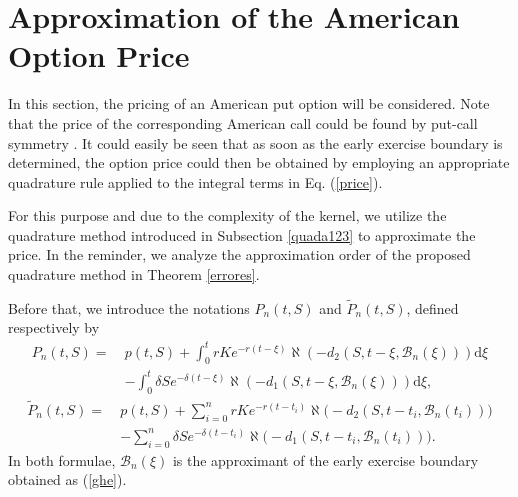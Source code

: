 \documentclass[fleqn,final,3p,11pt]{elsarticle}
\theoremstyle{definition}
\theoremstyle{remark}
\numberwithin{equation}{section}
\begin{document}
\section{Approximation of the American Option Price}\label{thistable}
In this section, the pricing of an American put option will be considered. Note that the price of the corresponding American call could be found by put-call symmetry \cite{andersen}. It could easily be seen that as soon as the early exercise boundary is determined, the option price could then be obtained by employing an appropriate quadrature rule applied to the integral terms in Eq. (\ref{price}).

 For this purpose and due to the complexity of the kernel, we utilize the quadrature method introduced in Subsection \ref{quada123} to approximate the price. In the reminder, we analyze the approximation order of the proposed  quadrature method in Theorem \ref{errores}.

Before that, we introduce the notations $P_{n}(t, S)$ and $\tilde{P}_{n}(t, S)$, defined respectively by
\begin{equation}\label{PN}
\begin{split}
P_{n}(t, S)=~&p(t, S) + \int_{0}^{t}rK e^{-r(t-\xi)}\aleph (-d_{2}(S, t -\xi, \mathcal{B}_{n}(\xi)))\mathrm{d}\xi \\
 &  - \int_{0}^{t} \delta S e^{-\delta (t- \xi)} \aleph (-d_{1}(S, t- \xi, \mathcal{B}_{n}(\xi)))  \mathrm{d}\xi,
  \end{split}
\end{equation}
\begin{equation}\label{PN2}
\begin{split}\tilde{P}_{n}(t, S) = ~&p(t, S) + \sum_{i=0}^{n}rK e^{-r(t - t_{i})}\aleph \Big(-d_{2}(S, t - t_{i}, \mathcal{B}_{n}(t_{i}))\Big) \\
 &  - \sum_{i=0}^{n} \delta S e^{-\delta (t- t_{i})} \aleph \Big(-d_{1}(S, t - t_{i}, \mathcal{B}_{n}(t_{i}))\Big).\end{split}
\end{equation}
In both formulae, $\mathcal{B}_{n}(\xi)$ is the approximant of the early exercise boundary obtained as (\ref{ghe}).
\end{document}
